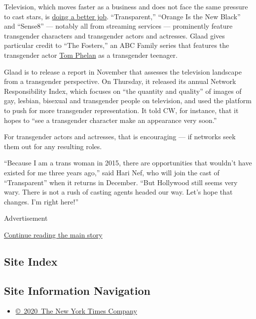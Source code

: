Television, which moves faster as a business and does not face the same
pressure to cast stars, is
\href{http://www.nytimes3xbfgragh.onion/2015/06/21/movies/broadening-a-transgender-tale-that-has-only-just-begun.html?_r=0}{doing
a better job}. ``Transparent,'' ``Orange Is the New Black'' and
``Sense8'' --- notably all from streaming services --- prominently
feature transgender characters and transgender actors and actresses.
Glaad gives particular credit to ``The Fosters,'' an ABC Family series
that features the transgender actor
\href{http://www.glaad.org/blog/fosters-actor-tom-phelan-talks-glaad-about-playing-one-tvs-new-trans-characters}{Tom
Phelan} as a transgender teenager.

Glaad is to release a report in November that assesses the television
landscape from a transgender perspective. On Thursday, it released its
annual Network Responsibility Index, which focuses on ``the quantity and
quality'' of images of gay, lesbian, bisexual and transgender people on
television, and used the platform to push for more transgender
representation. It told CW, for instance, that it hopes to ``see a
transgender character make an appearance very soon.''

For transgender actors and actresses, that is encouraging --- if
networks seek them out for any resulting roles.

``Because I am a trans woman in 2015, there are opportunities that
wouldn't have existed for me three years ago,'' said Hari Nef, who will
join the cast of ``Transparent'' when it returns in December. ``But
Hollywood still seems very wary. There is not a rush of casting agents
headed our way. Let's hope that changes. I'm right here!''

Advertisement

\protect\hyperlink{after-bottom}{Continue reading the main story}

\hypertarget{site-index}{%
\subsection{Site Index}\label{site-index}}

\hypertarget{site-information-navigation}{%
\subsection{Site Information
Navigation}\label{site-information-navigation}}

\begin{itemize}
\tightlist
\item
  \href{https://help.nytimes3xbfgragh.onion/hc/en-us/articles/115014792127-Copyright-notice}{©~2020~The
  New York Times Company}
\end{itemize}

